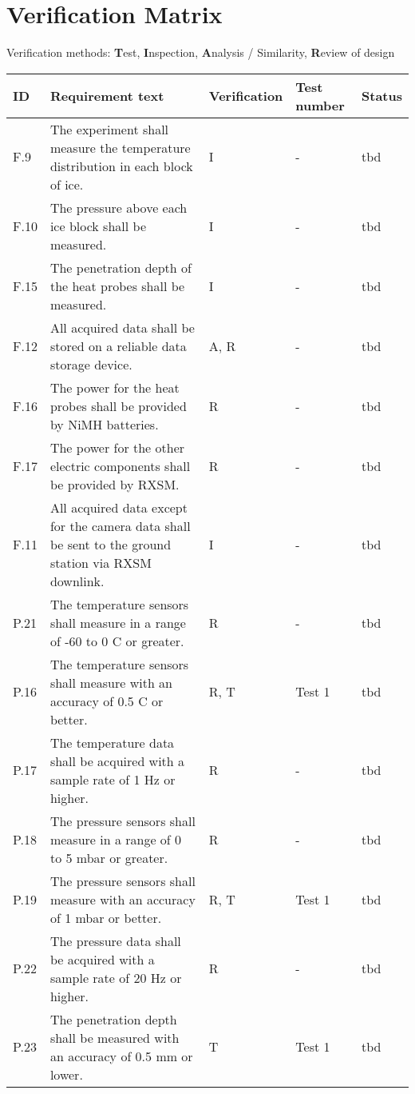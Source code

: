 \documentclass[11pt]{scrartcl}
\begin{document}
 \section{Verification Matrix}
 
 Verification methods: \textbf{T}est, \textbf{I}nspection, \textbf{A}nalysis / Similarity, \textbf{R}eview of design
 
 \begin{center}
	\begin{longtable}{| p{} | p{} | p{} | p{} | p{} |}
		\hline
		ID & Requirement text & Verification & Test number & Status \\
		\hline
		F.9 & The experiment shall measure the temperature distribution in each block of ice. & I & - & tbd \\
		F.10 & The pressure above each ice block shall be measured. & I & - & tbd \\
		F.15 & The penetration depth of the heat probes shall be measured. & I & - & tbd \\
		F.12 & All acquired data shall be stored on a reliable data storage device. & A, R & - & tbd \\
		F.16 & The power for the heat probes shall be provided by NiMH batteries. & R & - & tbd \\
		F.17 & The power for the other electric components shall be provided by RXSM. & R & - & tbd \\
		F.11 & All acquired data except for the camera data shall be sent to the ground station via RXSM downlink. & I & - & tbd \\
		\hline
		P.21 & The temperature sensors shall measure in a range of -60 to 0 \textdegree C or greater. & R & - & tbd \\
		P.16 & The temperature sensors shall measure with an accuracy of 0.5 \textdegree C or better. & R, T & Test 1 & tbd \\
		P.17 & The temperature data shall be acquired with a sample rate of 1 Hz or higher. & R & - & tbd \\
		P.18 & The pressure sensors shall measure in a range of 0 to 5 mbar or greater. & R & - & tbd \\
		P.19 & The pressure sensors shall measure with an accuracy of 1 mbar or better. & R, T & Test 1 & tbd \\
		P.22 & The pressure data shall be acquired with a sample rate of 20 Hz or higher\textsl{}. & R & - & tbd \\
		P.23 & The penetration depth shall be measured with an accuracy of 0.5 mm or lower. & T & Test 1 & tbd \\

\end{longtable}
\end{center}
\end{document}
